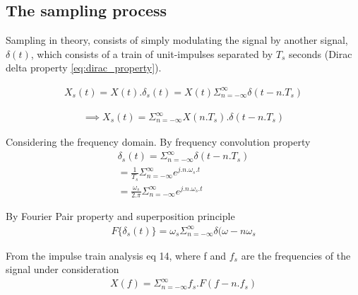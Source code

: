 \documentclass{article}
\begin{document}
\subsection{The sampling process}
Sampling in theory, consists of simply modulating the signal by another signal, $\delta(t)$, which consists of a train of unit-impulses separated by $T_s$ seconds (Dirac delta property \eqref{eq:dirac_property}).

\begin{equation}
\begin{aligned}
    X_s(t) = X(t).\delta_s(t) = X(t) \Sigma_{n = -\infty}^{\infty} \delta(t-n.T_s) 
\end{aligned}
\end{equation}

\begin{equation}
\begin{aligned}
    \implies X_s(t) =  \Sigma_{n = -\infty}^{\infty} X(n.T_s). \delta(t-n.T_s)
\end{aligned}
\end{equation}

Considering the frequency domain. By frequency convolution property  
\begin{equation}
\begin{aligned}
    \delta_s(t) =  \Sigma_{n = -\infty}^{\infty} \delta(t - n.T_s) \\
     = \frac{1}{T_s} \Sigma_{n = -\infty}^{\infty} e^{j.n.\omega_s.t} \\
     = \frac{\omega_s}{2.\pi} \Sigma_{n = -\infty}^{\infty} e^{j.n.\omega_s.t}
\end{aligned}
\end{equation}

By Fourier Pair property and superposition principle 
\begin{equation}
\begin{aligned}
    F \{ \delta_s(t) \} = \omega_s \Sigma_{n = -\infty}^{\infty} \delta(\omega - n\omega_s 
\end{aligned}
\end{equation}

From the impulse train analysis eq 14, where f and $f_s$ are the frequencies of the signal under consideration
\begin{equation}
\begin{aligned}
    X(f) = \Sigma_{n = -\infty}^{\infty} f_s . F(f-n.f_s)
\end{aligned}
\end{equation}
\end{document}
